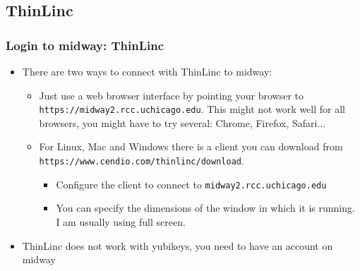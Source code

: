 \subsection{ThinLinc}
\begin{frame}[fragile]
  \frametitle{Login to midway: ThinLinc}
  \begin{itemize}
    \item There are two ways to connect with ThinLinc to midway:
      \begin{itemize}
        \item Just use a web browser interface by pointing your browser to {\color{mycolorcli}\verb|https://midway2.rcc.uchicago.edu|}. 
          This might not work well for all browsers, you might have to try several: Chrome, Firefox, Safari...
        \item For Linux, Mac and Windows there is a client you can download from {\color{mycolorcli}\verb|https://www.cendio.com/thinlinc/download|}. 
          \begin{itemize}
          \item Configure the client to connect to {\color{mycolorcli}\verb|midway2.rcc.uchicago.edu|}
          \item You can specify the dimensions of the window in which it is running. I am usually using full screen.
          \end{itemize}
      \end{itemize}
    \item ThinLinc does not work with yubikeys, you need to have an account on midway
  \end{itemize}
\end{frame}
